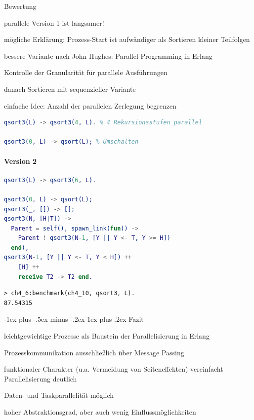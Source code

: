 \documentclass[10pt]{article}
\makeatletter
\renewcommand{\subsubsection}{\@startsection{subsubsection}{3}{0mm}%
                                {-1ex plus -.5ex minus -.2ex}%
                                {1ex plus .2ex}%
                                {\normalfont\small\bfseries}}
\makeatother
\begin{document}
  Bewertung
  \begin{itemize*}
    \item parallele Version 1 ist langsamer!
    \item mögliche Erklärung: Prozess-Start ist aufwändiger als Sortieren kleiner Teilfolgen
    \item bessere Variante nach John Hughes: Parallel Programming in Erlang
    \begin{itemize*}
      \item Kontrolle der Granularität für parallele Ausführungen
      \item danach Sortieren mit sequenzieller Variante
      \item einfache Idee: Anzahl der parallelen Zerlegung begrenzen
    \end{itemize*}
  \end{itemize*}
  \begin{lstlisting}[language=erlang]
qsort3(L) -> qsort3(4, L). % 4 Rekursionsstufen parallel

qsort3(0, L) -> qsort(L); % Umschalten
\end{lstlisting}
  
  \paragraph{Version 2}
  \begin{lstlisting}[language=erlang]
qsort3(L) -> qsort3(6, L).

qsort3(0, L) -> qsort(L);
qsort3(_, []) -> [];
qsort3(N, [H|T]) ->
  Parent = self(), spawn_link(fun() ->
    Parent ! qsort3(N-1, [Y || Y <- T, Y >= H])
  end),
qsort3(N-1, [Y || Y <- T, Y < H]) ++
    [H] ++
    receive T2 -> T2 end.  
\end{lstlisting}
  \begin{lstlisting}
> ch4_6:benchmark(ch4_10, qsort3, L).
87.54315
\end{lstlisting}
  
  \subsubsection{Fazit}
  \begin{itemize*}
    \item \color{orange} leichtgewichtige Prozesse \color{black} als Baustein der Parallelisierung in Erlang
    \item Prozesskommunikation ausschließlich über \color{orange} Message Passing \color{black}
    \item \color{orange} funktionaler Charakter \color{black} (u.a. Vermeidung von Seiteneffekten) vereinfacht Parallelisierung deutlich
    \item \color{orange} Daten- und Taskparallelität \color{black} möglich
    \item hoher Abstraktionsgrad, aber auch wenig Einflussmöglichkeiten
  \end{itemize*}
  
\end{document}
